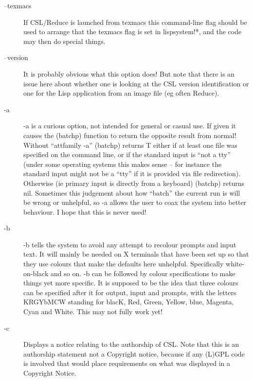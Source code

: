 \documentclass[a4paper,11pt]{article}
\begin{document}
\begin{description}
\item [{\ttfamily --texmacs}] 
If CSL/Reduce is launched from texmacs this command-line flag should be
used to arrange that the {\ttfamily texmacs} flag is set in
{\ttfamily lispsystem!*}, and the code may then do special things.

\item [{\ttfamily --version}] 
It is probably obvious what this option does! But note that there is an
issue here about whether one is looking at the CSL version identification or
one for the Lisp application from an image file (eg often Reduce).

\item [{\ttfamily -a}] 
{\ttfamily -a} is a curious option, not intended for general or casual use.
If given it causes the {\ttfamily (batchp)} function to return the opposite
result from normal!  Without ``{attfamily -a}'' {\ttfamily (batchp)} returns
{\ttfamily T} either if at least one file was specified on the command line,
or if the standard input is ``not a tty'' (under some operating systems this
makes sense -- for instance the standard input might not be a ``tty'' if it
is provided via file redirection).  Otherwise (ie primary input is directly
from a keyboard) {\ttfamily (batchp)} returns {\ttfamily nil}.  Sometimes
this judgement about how ``batch'' the current run is will be wrong or
unhelpful, so {\ttfamily -a} allows the user to coax the system into better
behaviour.  I hope that this is never used!

\item [{\ttfamily -b}] 
{\ttfamily -b} tells the system to avoid any attempt to recolour prompts
and input text. It will mainly be needed on X terminals that have been
set up so that they use colours that make the defaults here unhelpful.
Specifically white-on-black and so on.
{\ttfamily -b} can be followed by colour specifications to make things yet
more specific. It is supposed to be the idea that three colours can be
specified after it for output, input and prompts, with the letters KRGYbMCW
standing for blacK, Red, Green, Yellow, blue, Magenta, Cyan and White.
This may not fully work yet!

\item [{\ttfamily -c}] 
Displays a notice relating to the authorship of CSL. Note that this
is an authorship statement not a Copyright notice, because if any
(L)GPL code is involved that would place requirements on what was
displayed in a Copyright Notice.


\end{description}
\end{document}
